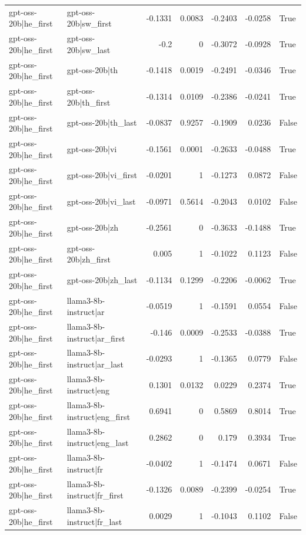 \begin{table}
\begin{tabular}{l l r r r r l}
gpt-oss-20b|he_first & gpt-oss-20b|sw_first & -0.1331 & 0.0083 & -0.2403 & -0.0258 & True \\
gpt-oss-20b|he_first & gpt-oss-20b|sw_last & -0.2 & 0 & -0.3072 & -0.0928 & True \\
gpt-oss-20b|he_first & gpt-oss-20b|th & -0.1418 & 0.0019 & -0.2491 & -0.0346 & True \\
gpt-oss-20b|he_first & gpt-oss-20b|th_first & -0.1314 & 0.0109 & -0.2386 & -0.0241 & True \\
gpt-oss-20b|he_first & gpt-oss-20b|th_last & -0.0837 & 0.9257 & -0.1909 & 0.0236 & False \\
gpt-oss-20b|he_first & gpt-oss-20b|vi & -0.1561 & 0.0001 & -0.2633 & -0.0488 & True \\
gpt-oss-20b|he_first & gpt-oss-20b|vi_first & -0.0201 & 1 & -0.1273 & 0.0872 & False \\
gpt-oss-20b|he_first & gpt-oss-20b|vi_last & -0.0971 & 0.5614 & -0.2043 & 0.0102 & False \\
gpt-oss-20b|he_first & gpt-oss-20b|zh & -0.2561 & 0 & -0.3633 & -0.1488 & True \\
gpt-oss-20b|he_first & gpt-oss-20b|zh_first & 0.005 & 1 & -0.1022 & 0.1123 & False \\
gpt-oss-20b|he_first & gpt-oss-20b|zh_last & -0.1134 & 0.1299 & -0.2206 & -0.0062 & True \\
gpt-oss-20b|he_first & llama3-8b-instruct|ar & -0.0519 & 1 & -0.1591 & 0.0554 & False \\
gpt-oss-20b|he_first & llama3-8b-instruct|ar_first & -0.146 & 0.0009 & -0.2533 & -0.0388 & True \\
gpt-oss-20b|he_first & llama3-8b-instruct|ar_last & -0.0293 & 1 & -0.1365 & 0.0779 & False \\
gpt-oss-20b|he_first & llama3-8b-instruct|eng & 0.1301 & 0.0132 & 0.0229 & 0.2374 & True \\
gpt-oss-20b|he_first & llama3-8b-instruct|eng_first & 0.6941 & 0 & 0.5869 & 0.8014 & True \\
gpt-oss-20b|he_first & llama3-8b-instruct|eng_last & 0.2862 & 0 & 0.179 & 0.3934 & True \\
gpt-oss-20b|he_first & llama3-8b-instruct|fr & -0.0402 & 1 & -0.1474 & 0.0671 & False \\
gpt-oss-20b|he_first & llama3-8b-instruct|fr_first & -0.1326 & 0.0089 & -0.2399 & -0.0254 & True \\
gpt-oss-20b|he_first & llama3-8b-instruct|fr_last & 0.0029 & 1 & -0.1043 & 0.1102 & False \\

\end{tabular}
\end{table}
